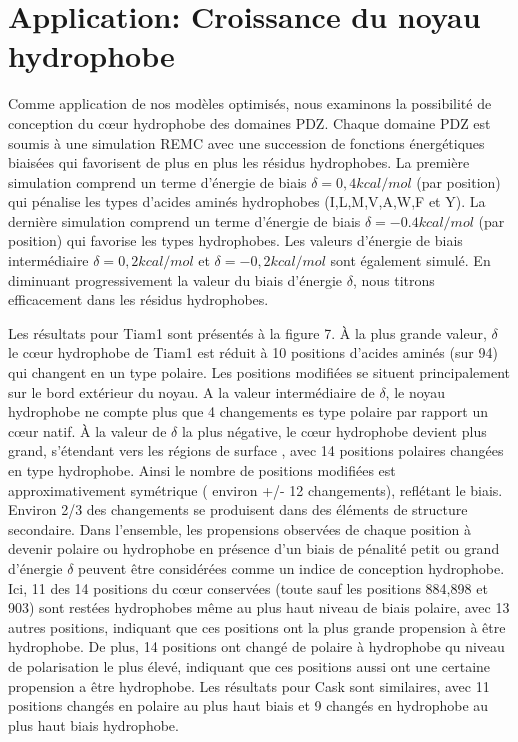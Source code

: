 \section{Application: Croissance du noyau hydrophobe}
Comme application de nos modèles optimisés, nous examinons la possibilité de conception du cœur hydrophobe des domaines PDZ. Chaque domaine PDZ est soumis à une simulation REMC avec une succession de fonctions énergétiques biaisées qui favorisent de plus en plus les résidus hydrophobes. La première simulation comprend un terme d'énergie de biais $\delta =0,4 kcal/mol$ (par position) qui pénalise les types d'acides aminés hydrophobes (I,L,M,V,A,W,F et Y). La dernière simulation comprend un terme d'énergie de biais $\delta = -0.4 kcal/mol$ (par position) qui favorise les types hydrophobes. Les valeurs d'énergie de biais intermédiaire $\delta =0,2 kcal/mol$ et $\delta = -0,2 kcal/mol$ sont également simulé. En diminuant progressivement la valeur du biais d'énergie $\delta$, nous \og titrons \fg efficacement dans les résidus hydrophobes.

Les résultats pour Tiam1 sont présentés à la figure 7. À la plus grande valeur, $\delta$ le cœur hydrophobe de Tiam1 est réduit à 10 positions d'acides aminés (sur 94) qui changent en un type polaire. Les positions modifiées se situent principalement sur le bord extérieur du noyau. A la valeur intermédiaire de $\delta$, le noyau hydrophobe ne compte plus que 4 changements es type polaire par rapport un cœur natif. À la valeur de $\delta$ la plus négative, le cœur hydrophobe devient plus grand, s'étendant vers les régions de surface , avec 14 positions polaires changées en type hydrophobe. Ainsi le nombre de positions modifiées est approximativement symétrique ( environ +/- 12 changements), reflétant le biais. Environ 2/3 des changements se produisent dans des éléments de structure secondaire. Dans l'ensemble, les propensions observées de chaque position à devenir polaire ou hydrophobe en présence d'un biais de pénalité petit ou grand d'énergie $\delta$ peuvent être considérées comme un indice de conception hydrophobe. Ici, 11 des 14 positions du cœur conservées (toute sauf les positions 884,898 et 903) sont restées hydrophobes même au plus haut niveau de biais polaire, avec 13 autres positions, indiquant que ces positions ont la plus grande propension à être hydrophobe. De plus, 14 positions ont changé de polaire à hydrophobe qu niveau de polarisation le plus élevé, indiquant que ces positions aussi ont une certaine propension a être hydrophobe. Les résultats pour Cask sont similaires, avec 11 positions changés en polaire au plus haut biais et 9 changés en hydrophobe au plus haut biais  hydrophobe.


